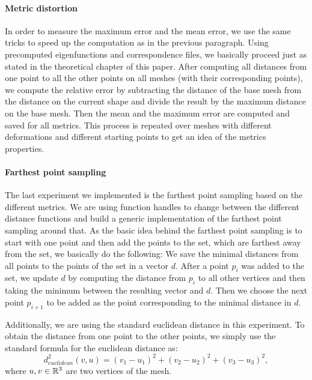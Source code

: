 \paragraph{Metric distortion}
In order to measure the maximum error and the mean error, we use the same tricks to speed up the computation as in the previous paragraph.
Using precomputed eigenfunctions and correspondence files, we basically proceed just as stated in the theoretical chapter of this paper.
After computing all distances from one point to all the other points on all meshes (with their corresponding points), we compute the relative error by subtracting the distance of the base mesh from the distance on the current shape and divide the result by the maximum distance on the base mesh.
Then the mean and the maximum error are computed and saved for all metrics.
This process is repeated over meshes with different deformations and different starting points to get an idea of the metrics properties.


\paragraph{Farthest point sampling}
The last experiment we implemented is the farthest point sampling based on the different metrics.
We are using function handles to change between the different distance functions and build a generic implementation of the farthest point sampling around that.
As the basic idea behind the farthest point sampling is to start with one point and then add the points to the set, which are farthest away from the set, we basically do the following:
We save the minimal distances from all points to the points of the set in a vector $d$.
After a point $p_i$ was added to the set, we update $d$ by computing the distance from $p_i$ to all other vertices and then taking the minimum between the resulting vector and $d$.
Then we choose the next point $p_{i+1}$ to be added as the point corresponding to the minimal distance in $d$.

Additionally, we are using the standard euclidean distance in this experiment.
To obtain the distance from one point to the other points, we simply use the standard formula for the euclidean distance as:
$$d_{euclidean}^2(v,u) = (v_1 -u_1)^2 + (v_2 - u_2)^2 + (v_3 - u_3)^2,$$
where $u,v\in \mathbb{R}^3$ are two vertices of the mesh.
